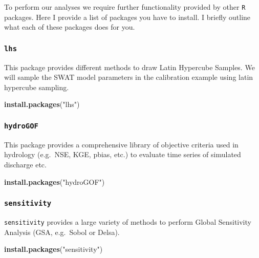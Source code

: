 \documentclass[11pt,]{article}
\newenvironment{Shaded}{}{}
\newcommand{\KeywordTok}[1]{\textcolor[rgb]{0.00,0.44,0.13}{\textbf{#1}}}
\newcommand{\StringTok}[1]{\textcolor[rgb]{0.25,0.44,0.63}{#1}}
\newcommand{\NormalTok}[1]{#1}
\begin{document}
To perform our analyses we require further functionality provided by
other \texttt{R} packages. Here I provide a list of packages you have to
install. I briefly outline what each of these packages does for you.

\subsubsection{\texorpdfstring{\texttt{lhs}}{lhs}}\label{lhs}

This package provides different methods to draw Latin Hypercube Samples.
We will sample the SWAT model parameters in the calibration example
using latin hypercube sampling.

\begin{Shaded}
\begin{Highlighting}[]
\KeywordTok{install.packages}\NormalTok{(}\StringTok{"lhs"}\NormalTok{)}
\end{Highlighting}
\end{Shaded}

\subsubsection{\texorpdfstring{\texttt{hydroGOF}}{hydroGOF}}\label{hydrogof}

This package provides a comprehensive library of objective criteria used
in hydrology (e.g.~NSE, KGE, pbias, etc.) to evaluate time series of
simulated discharge etc.

\begin{Shaded}
\begin{Highlighting}[]
\KeywordTok{install.packages}\NormalTok{(}\StringTok{"hydroGOF"}\NormalTok{)}
\end{Highlighting}
\end{Shaded}

\subsubsection{\texorpdfstring{\texttt{sensitivity}}{sensitivity}}\label{sensitivity}

\texttt{sensitivity} provides a large variety of methods to perform
Global Sensitivity Analysis (GSA, e.g.~Sobol or Delsa).

\begin{Shaded}
\begin{Highlighting}[]
\KeywordTok{install.packages}\NormalTok{(}\StringTok{"sensitivity"}\NormalTok{)}
\end{Highlighting}
\end{Shaded}
\end{document}
